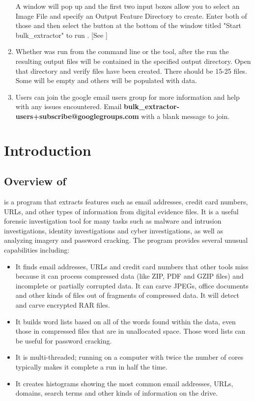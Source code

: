 \documentclass[11pt]{article} %
\begin{document}
\begin{enumerate}
A window will pop up and the first two input boxes allow you to select an Image File and specify an Output Feature Directory to create. Enter both of those and then select the button at the bottom of the window titled "Start bulk\_extractor" to run \bulk.
[See \textbf{} \textbf{}]

\item Whether \bulk was run from the command line or the \viewer tool, after the run the resulting output files will be contained in the specified output directory. Open that directory and verify files have been created. There should be 15-25 files. Some will be empty and others will be populated with data.

\item Users can join the google email users group for more information and help with any issues encountered. Email \textbf{bulk\_extractor-users+subscribe@googlegroups.com} with a blank message to join.
\end{enumerate}
\newpage


\tableofcontents
\newpage
{}





\newpage

\section{Introduction}

\subsection{Overview of \bulk}
\bulk is a program that extracts features such as email addresses, credit card numbers, URLs, and other types of information from digital evidence files. It is a useful forensic investigation tool for many tasks such as malware and intrusion investigations, identity investigations and cyber investigations, as well as analyzing imagery and password cracking. The program provides several unusual capabilities including:
\begin{itemize}
\item It finds email addresses, URLs and credit card numbers that other tools miss because it can process compressed data (like ZIP, PDF and GZIP files) and incomplete or partially corrupted data. It can carve JPEGs, office documents and other kinds of files out of fragments of compressed data. It will detect and carve encrypted RAR files.
\item It builds word lists based on all of the words found within the data, even those in compressed files that are in unallocated space. Those word lists can be useful for password cracking.
\item It is multi-threaded; running \bulk on a computer with twice the number of cores typically makes it complete a run in half the time.
\item It creates histograms showing the most common email addresses, URLs, domains, search terms and other kinds of information on the drive.
\end{itemize}
\end{document}
